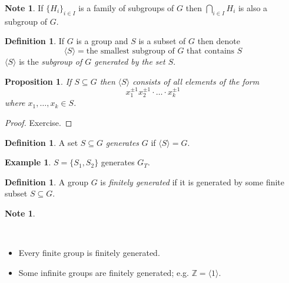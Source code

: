 \documentclass[12pt, letterpaper, oneside]{article}
\theoremstyle{plain}
\newtheorem{proposition}[theorem]{Proposition}
\theoremstyle{definition}
\newtheorem{definition}[theorem]{Definition}
\newtheorem{example}[theorem]{Example}
\newtheorem{note}[theorem]{Note}
\newcommand{\Z}{{\mathbb Z}}
\newcommand{\subgp}[1]{\langle#1\rangle}
\newcommand{\vs}{\vskip 5mm}
\newcommand{\isep}[1][0]{\setlength{\itemsep}{#1 mm}}
\begin{document}
\vs

\begin{note}
If $\{ H_{i} \}_{i\in I}$ is a family of subgroups of $G$ then $\bigcap_{i\in I} H_{i}$ is also a subgroup 
of $G$.  
\end{note}

\vs

\begin{definition}
If $G$ is a group and $S$ is a subset of $G$ then denote
$$\subgp{S} = \text{the smallest subgroup of } G \text{ that contains } S$$
$\subgp{S}$ is the \emph{subgroup of $G$ generated by the set $S$}.
\end{definition}


\vskip 5mm

\begin{proposition}
If $S\subseteq G$ then $\subgp{S}$ consists of all elements of the form
$$x_{1}^{\pm 1}x_{2}^{\pm 1}\cdot \dots \cdot x_{k}^{\pm 1}$$
where $x_{1}, \dots, x_{k}\in S$.
\end{proposition}

\begin{proof}
Exercise.
\end{proof}

\vskip 5mm

\begin{definition}
A set $S\subseteq G$ \emph{generates} $G$ if $\subgp{S} = G$.
\end{definition}

\vskip 5mm

\begin{example}
$S= \{S_{1}, S_{2}\}$ generates $G_{T}$. 
\end{example}


\vskip 5mm

\begin{definition}
A group $G$ is \emph{finitely generated} if it is generated by some finite subset $S\subseteq G$.
\end{definition}


\vskip 5mm

\begin{note} \ 

\vskip -13mm

\ 
\begin{itemize}
\isep
\item Every finite group is finitely generated.

\item Some infinite groups are finitely generated; e.g. $\Z = \subgp{1}$.
\end{itemize}
\end{note}
\end{document}
